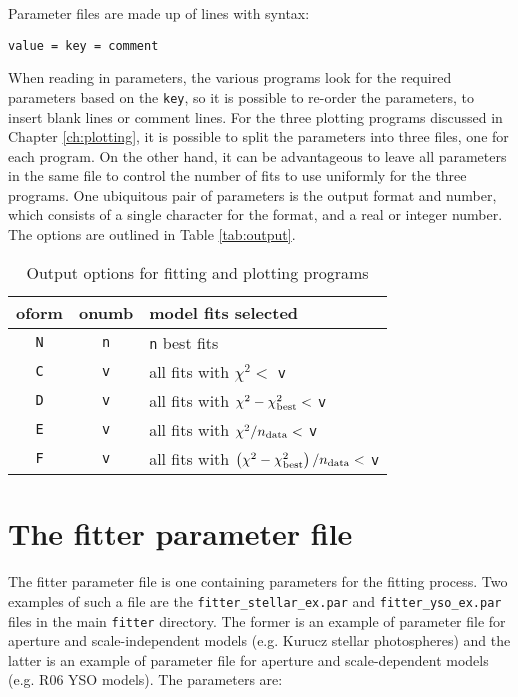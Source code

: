 \documentclass[letterpaper,11pt]{report}
\begin{document}
\label{sec:parameters}

Parameter files are made up of lines with syntax:

\begin{verbatim}
value = key = comment
\end{verbatim}

When reading in parameters, the various programs look for the required parameters based on the \texttt{key}, so it is possible to re-order the parameters, to insert blank lines or comment lines. For the three plotting programs discussed in Chapter \ref{ch:plotting}, it is possible to split the parameters into three files, one for each program. On the other hand, it can be advantageous to leave all parameters in the same file to control the number of fits to use uniformly for the three programs. One ubiquitous pair of parameters is the output format and number, which consists of a single character for the format, and a real or integer number. The options are outlined in Table \ref{tab:output}.

\begin{table}[t]
\caption{Output options for fitting and plotting programs\label{tab:output}}
\begin{center}
\setlength{\extrarowheight}{0.1in}
\begin{tabular}{ccp{3in}}
\textbf{oform} & \textbf{onumb} & \textbf{model fits selected} \\ 
\hline
\texttt{N} & \texttt{n} & \texttt{n} best fits\\
\texttt{C} & \texttt{v} &  all fits with $\chi^2<$ \texttt{v}\\
\texttt{D} & \texttt{v} &  all fits with $\chi^2-\chi_{\rm best}^2<$ \texttt{v}\\
\texttt{E} & \texttt{v} &  all fits with $\chi^2/n_{\rm data}<$ \texttt{v}\\
\texttt{F} & \texttt{v} &  all fits with $\left(\chi^2-\chi_{\rm best}^2\right)/n_{\rm data}<$ \texttt{v}\\
\end{tabular}
\end{center}
\label{default}
\end{table}

\section{The fitter parameter file}

\label{sec:fitterpar}

The fitter parameter file is one containing parameters for the fitting process. Two examples of such a file are the \texttt{fitter\_stellar\_ex.par} and \texttt{fitter\_yso\_ex.par} files in the main \texttt{fitter} directory. The former is an example of parameter file for aperture and scale-independent models (e.g. Kurucz stellar photospheres) and the latter is an example of parameter file for aperture and scale-dependent models  (e.g. R06 YSO models). The parameters are:
\end{document}
